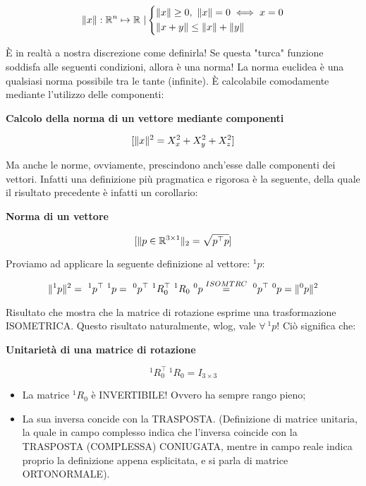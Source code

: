 \[
	\lVert x\rVert:\mathbb{R}^n\mapsto \mathbb{R}\ |\\
	\left\{
	\begin{aligned}
	&\lVert x\rVert \geq 0,\ \lVert x\rVert = 0 \iff x=0\\
	&\lVert x+y\rVert \le \lVert x\rVert+\lVert y\rVert
	\end{aligned}
	\right.
\]

\`E in realtà a nostra discrezione come definirla! Se questa "turca" funzione soddisfa alle seguenti condizioni, allora è una norma! La norma euclidea è una qualsiasi norma possibile tra le tante (infinite). \`E calcolabile comodamente mediante l'utilizzo delle componenti:

\begin{corl}{\textbf{Calcolo della norma di un vettore mediante componenti}}

\[
	[\lVert x\rVert^2 = X_x^2 + X_y^2 + X_z^2]
\]

\end{corl}

Ma anche le norme, ovviamente, prescindono anch'esse dalle componenti dei vettori. Infatti una definizione più pragmatica e rigorosa è la seguente, della quale il risultato precedente è infatti un corollario:

\begin{defn}{\textbf{Norma di un vettore}}

\[
	[\lVert p\in\mathbb{R}^{3\times 1}\rVert_2 = \sqrt{p^\top p}]
\]

\end{defn}

Proviamo ad applicare la seguente definizione al vettore: $^1p$:

\[
	\norma{^1p}^2 =\ ^1p^\top\ ^1p =\ ^0p^\top\ ^1R_0^\top\ ^1R_0\ ^0p \stackrel{ISOMTRC}{=}\ ^0p^\top\ ^0p = \norma{^0p}^2
\]

Risultato che mostra che la matrice di rotazione esprime una trasformazione ISOMETRICA. Questo risultato naturalmente, wlog, vale $\forall\ ^1p$! Ciò significa che:

\begin{defn}{\textbf{Unitarietà di una matrice di rotazione}}

\[
	^1R_0^\top\ ^1R_0 = I_{3\times 3}
\]

\begin{itemize}
\item La matrice $^1R_0$ è INVERTIBILE! Ovvero ha sempre rango pieno;
\item La sua inversa concide con la TRASPOSTA. (Definizione di matrice unitaria, la quale in campo complesso indica che l'inversa coincide con la TRASPOSTA (COMPLESSA) CONIUGATA, mentre in campo reale indica proprio la definizione appena esplicitata, e si parla di matrice ORTONORMALE).
\end{itemize}

\end{defn}

